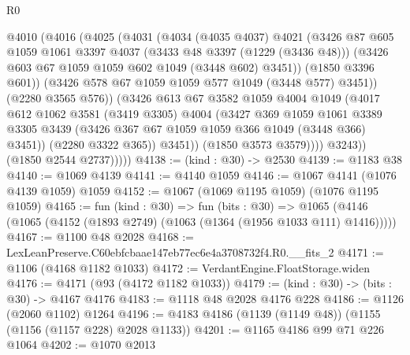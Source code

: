 \begin{lexlean}{R0}
\begin{coremodule}
                    @4010
                      (@4016
                        (@4025
                          (@4031
                            (@4034
                              (@4035 @4037)
                              @4021
                              (@3426
                                @87
                                @605
                                @1059
                                @1061
                                @3397
                                @4037
                                (@3433 @48 @3397 (@1229 (@3436 @48)))
                                (@3426 @603 @67 @1059 @1059 @602 @1049 (@3448 @602) @3451))
                              (@1850 @3396 @601))
                            (@3426 @578 @67 @1059 @1059 @577 @1049 (@3448 @577) @3451))
                          (@2280 @3565 @576))
                        (@3426
                          @613
                          @67
                          @3582
                          @1059
                          @4004
                          @1049
                          (@4017
                            @612
                            @1062
                            @3581
                            (@3419 @3305)
                            @4004
                            (@3427
                              @369
                              @1059
                              @1061
                              @3389
                              @3305
                              @3439
                              (@3426 @367 @67 @1059 @1059 @366 @1049 (@3448 @366) @3451))
                            (@2280 @3322 @365))
                          @3451))
                      (@1850 @3573 @3579))))
                @3243))
            (@1850 @2544 @2737)))))
@4138 := (kind : @30) -> @2530
@4139 := @1183 @38
@4140 := @1069 @4139
@4141 := @4140 @1059
@4146 := @1067 @4141 (@1076 @4139 @1059) @1059
@4152 := @1067 (@1069 @1195 @1059) (@1076 @1195 @1059)
@4165 := fun (kind : @30) =>
  fun (bits : @30) =>
  @1065 (@4146 (@1065 (@4152 (@1893 @2749) (@1063 (@1364 (@1956 @1033 @111) @1416)))))
@4167 := @1100 @48 @2028
@4168 := LexLeanPreserve.C60ebfcbaae147eb77ec6e4a3708732f4.R0.__fits_2
@4171 := @1106 (@4168 @1182 @1033)
@4172 := VerdantEngine.FloatStorage.widen
@4176 := @4171 (@93 (@4172 @1182 @1033))
@4179 := (kind : @30) -> (bits : @30) -> @4167 @4176
@4183 := @1118 @48 @2028 @4176 @228
@4186 := @1126 (@2060 @1102) @1264
@4196 := @4183 @4186 (@1139 (@1149 @48)) (@1155 (@1156 (@1157 @228) @2028 @1133))
@4201 := @1165 @4186 @99 @71 @226 @1064
@4202 := @1070 @2013

\end{coremodule}
\end{lexlean}
